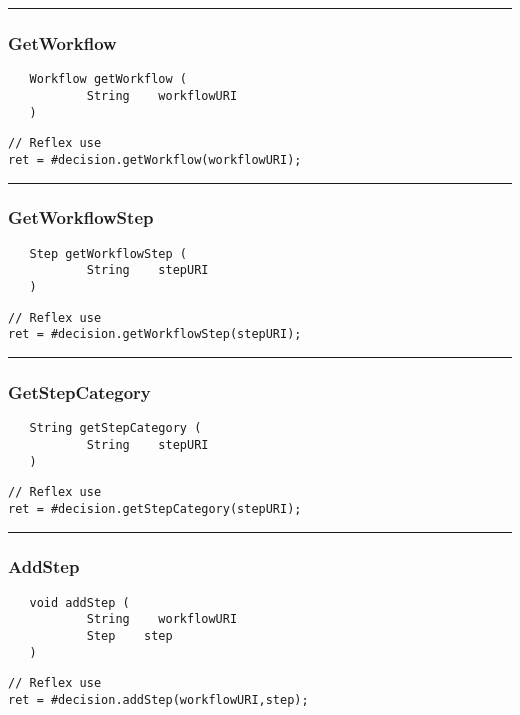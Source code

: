 \rule{15cm}{2pt}
\subsubsection{GetWorkflow}
\label{Api:GetWorkflow}
\begin{verbatim}
   Workflow getWorkflow (
           String    workflowURI
   )
\end{verbatim}
\begin{lstlisting}[language=reflex]
// Reflex use
ret = #decision.getWorkflow(workflowURI);
\end{lstlisting}



\rule{15cm}{2pt}
\subsubsection{GetWorkflowStep}
\label{Api:GetWorkflowStep}
\begin{verbatim}
   Step getWorkflowStep (
           String    stepURI
   )
\end{verbatim}
\begin{lstlisting}[language=reflex]
// Reflex use
ret = #decision.getWorkflowStep(stepURI);
\end{lstlisting}



\rule{15cm}{2pt}
\subsubsection{GetStepCategory}
\label{Api:GetStepCategory}
\begin{verbatim}
   String getStepCategory (
           String    stepURI
   )
\end{verbatim}
\begin{lstlisting}[language=reflex]
// Reflex use
ret = #decision.getStepCategory(stepURI);
\end{lstlisting}



\rule{15cm}{2pt}
\subsubsection{AddStep}
\label{Api:AddStep}
\begin{verbatim}
   void addStep (
           String    workflowURI
           Step    step
   )
\end{verbatim}
\begin{lstlisting}[language=reflex]
// Reflex use
ret = #decision.addStep(workflowURI,step);
\end{lstlisting}



